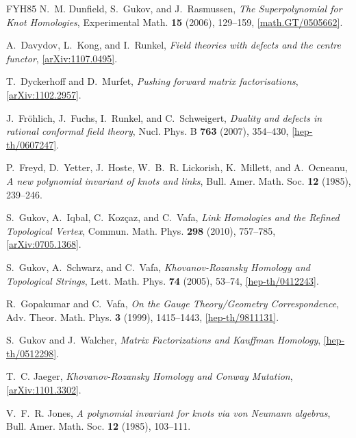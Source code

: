 \documentclass{compositio}
\theoremstyle{definition}
\numberwithin{equation}{section}
\begin{document}
\begin{thebibliography}{FYH{\etalchar{+}}85}
N.~M. Dunfield, S.~Gukov, and J.~Rasmussen, \emph{The {S}uperpolynomial for
  {K}not {H}omologies}, Experimental Math. \textbf{15} (2006), 129--159,
  \href{http://arxiv.org/abs/math/0505662}{[math.GT/0505662]}.

A.~Davydov, L.~Kong, and I.~Runkel, \emph{Field theories with defects and the
  centre functor}, \href{http://arxiv.org/abs/1107.0495}{[arXiv:1107.0495]}.

T.~Dyckerhoff and D.~Murfet, \emph{Pushing forward matrix factorisations},
  \href{http://arxiv.org/abs/1102.2957}{[arXiv:1102.2957]}.

J.~Fr\"ohlich, J.~Fuchs, I.~Runkel, and C.~Schweigert, \emph{Duality and
  defects in rational conformal field theory}, Nucl. Phys. B \textbf{763}
  (2007), 354--430,
  \href{http://arxiv.org/abs/hep-th/0607247}{[hep-th/0607247]}.

P.~Freyd, D.~Yetter, J.~Hoste, W.~B.~R. Lickorish, K.~Millett, and A.~Ocneanu,
  \emph{A new polynomial invariant of knots and links}, Bull. Amer. Math. Soc.
  \textbf{12} (1985), 239--246.

S.~Gukov, A.~Iqbal, C.~Koz\c{c}az, and C.~Vafa, \emph{Link {H}omologies and the
  {R}efined {T}opological {V}ertex}, Commun. Math. Phys. \textbf{298} (2010),
  757--785, \href{http://arxiv.org/abs/0705.1368}{[arXiv:0705.1368]}.

S.~Gukov, A.~Schwarz, and C.~Vafa, \emph{Khovanov-{R}ozansky {H}omology and
  {T}opological {S}trings}, Lett. Math. Phys. \textbf{74} (2005), 53--74,
  \href{http://arxiv.org/abs/hep-th/0412243}{[hep-th/0412243]}.

R.~Gopakumar and C.~Vafa, \emph{On the {G}auge {T}heory/{G}eometry
  {C}orrespondence}, Adv. Theor. Math. Phys. \textbf{3} (1999), 1415--1443,
  \href{http://arxiv.org/abs/hep-th/9811131}{[hep-th/9811131]}.

S.~Gukov and J.~Walcher, \emph{Matrix {F}actorizations and {K}auffman
  {H}omology}, \href{http://arxiv.org/abs/hep-th/0512298}{[hep-th/0512298]}.

T.~C. Jaeger, \emph{Khovanov-{R}ozansky {H}omology and {C}onway {M}utation},
  \href{http://arxiv.org/abs/1101.3302}{[arXiv:1101.3302]}.

V.~F.~R. Jones, \emph{A polynomial invariant for knots via von {N}eumann
  algebras}, Bull. Amer. Math. Soc. \textbf{12} (1985), 103--111.


\end{thebibliography}
\end{document}
